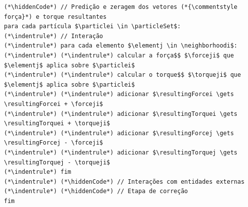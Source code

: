 \begin{lstlisting}[float, floatplacement=h, language=pseudocode, label=lst:third_law_of_newton, caption=Pseudocódigo para a aplicação da Terceira Lei de Newton.]
(*\hiddenCode*) // Predição e zeragem dos vetores (*{\commentstyle força}*) e torque resultantes
para cada partícula $\particlei \in \particleSet$:
(*\indentrule*)	// Interação
(*\indentrule*)	para cada elemento $\elementj \in \neighborhoodi$:
(*\indentrule*)	(*\indentrule*)	calcular a força$$ $\forceji$ que $\elementj$ aplica sobre $\particlei$
(*\indentrule*)	(*\indentrule*)	calcular o torque$$ $\torqueji$ que $\elementj$ aplica sobre $\particlei$
(*\indentrule*)	(*\indentrule*)	adicionar $\resultingForcei \gets \resultingForcei + \forceji$
(*\indentrule*)	(*\indentrule*)	adicionar $\resultingTorquei \gets \resultingTorquei + \torqueji$
(*\indentrule*)	(*\indentrule*)	adicionar $\resultingForcej \gets \resultingForcej - \forceji$
(*\indentrule*)	(*\indentrule*)	adicionar $\resultingTorquej \gets \resultingTorquej - \torqueji$
(*\indentrule*)	fim
(*\indentrule*)	(*\hiddenCode*) // Interações com entidades externas
(*\indentrule*)	(*\hiddenCode*) // Etapa de correção
fim
\end{lstlisting}





